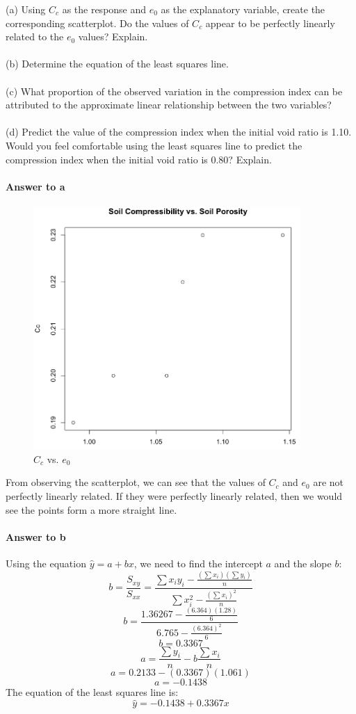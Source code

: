 \documentclass{article}
\newcommand{\p}[1]{\paragraph{#1}} %
\begin{document}
	(a) Using $C_c$ as the response and $e_0$ as the explanatory variable, create the 
	corresponding scatterplot. Do the values of $C_c$ appear to be perfectly linearly related to the 
	$e_0$ values? Explain. \\ \\
	(b) Determine the equation of the least squares line. \\ \\
	(c) What proportion of the observed variation in the compression index can be attributed to the 
	approximate linear relationship between the two variables? \\ \\
	(d) Predict the value of the compression index when the initial void ratio is 1.10. Would you 
	feel comfortable using the least squares line to predict the compression index when the initial 
	void ratio is 0.80? Explain.
	
	\p{Answer to a}
	\begin{figure}[!htb]
	   \centering
	   \includegraphics[width=4in]{img/Prob7a.jpg} 
	   \caption{$C_c$ vs. $e_0$}
	   \label{fig:example}
	\end{figure}
	From observing the scatterplot, we can see that the values of $C_c$ and $e_0$ are not 
	perfectly linearly related. If they were perfectly linearly related, then we would see the points 
	form a more straight line.
	
	\p{Answer to b}
	Using the equation $\hat{y} = a + bx$, we need to find the intercept $a$ and the slope $b$:
	\[ b = \frac{S_{xy}}{S_{xx}} = \frac{\sum x_iy_i - \frac{(\sum x_i)(\sum y_i)}{n}}{\sum x_i^2 - 
	\frac{(\sum x_i)^2}{n}} \]
	\[ b = \frac{1.36267 - \frac{(6.364)(1.28)}{6}}{6.765 - \frac{(6.364)^2}{6}} \]
	\[ b = 0.3367 \]
	\[ a = \frac{\sum y_i}{n} - b\frac{\sum x_i}{n} \]
	\[ a = 0.2133 - (0.3367)(1.061) \]
	\[ a = -0.1438 \]
	The equation of the least squares line is:
	\[ \hat{y} = -0.1438 + 0.3367x \]
	
\end{document}
